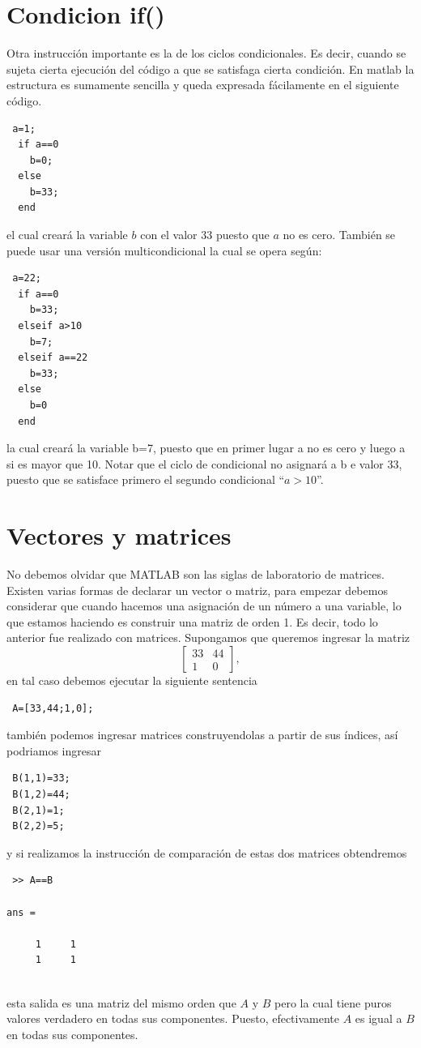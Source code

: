 \documentclass[11pt]{article}
\begin{document}
\section{Condicion if()}
Otra instrucci\'on importante es la de los ciclos condicionales. Es decir, cuando se sujeta cierta 
ejecuci\'on del c\'odigo a que se satisfaga cierta condici\'on. En matlab la estructura es sumamente sencilla 
y queda expresada f\'acilamente en el siguiente c\'odigo.
\begin{verbatim}
 a=1;
  if a==0
    b=0;
  else
    b=33;
  end
\end{verbatim}
el cual crear\'a la variable $b$ con el valor $33$ puesto que $a$ no es cero. Tambi\'en se puede usar una versi\'on multicondicional 
la cual se opera seg\'un:
\begin{verbatim}
 a=22;
  if a==0
    b=33;
  elseif a>10
    b=7;
  elseif a==22
    b=33;
  else
    b=0
  end
\end{verbatim}
la cual crear\'a la variable b=7, puesto que en primer lugar a no es cero y luego a si es mayor que 10. Notar que el ciclo 
de condicional no asignar\'a a b e valor 33, puesto que se satisface primero el segundo condicional ``$a>10$''.
%
\section{Vectores y matrices}
No debemos olvidar que MATLAB son las siglas de laboratorio de matrices. Existen varias formas de declarar un vector o matriz, 
para empezar debemos considerar que cuando hacemos una asignaci\'on de un n\'umero a una variable, lo que estamos haciendo es 
construir una matriz de orden 1. Es decir, todo lo anterior fue realizado con matrices. Supongamos que queremos 
ingresar la matriz
$$
\left [
  \begin{array}{cc}
    33 & 44 \\
    1  & 0
  \end{array}
\right ],
$$
en tal caso debemos ejecutar la siguiente sentencia
\begin{verbatim}
 A=[33,44;1,0];
\end{verbatim}
tambi\'en podemos ingresar matrices construyendolas a partir de sus \'indices, as\'i podriamos ingresar 
\begin{verbatim}
 B(1,1)=33;
 B(1,2)=44;
 B(2,1)=1;
 B(2,2)=5;
\end{verbatim}
y si realizamos la instrucci\'on de comparaci\'on de estas dos matrices obtendremos
\begin{verbatim}
 >> A==B

ans =

     1     1
     1     1
     
\end{verbatim}
esta salida es una matriz del mismo orden que $A$ y $B$ pero la cual tiene puros valores verdadero 
en todas sus componentes. Puesto, efectivamente $A$ es igual a $B$ en todas sus componentes.
\end{document}
